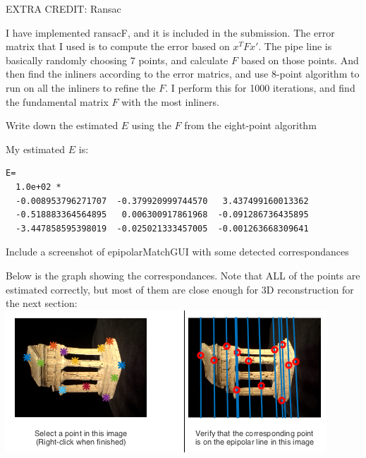 \documentclass[12pt,letterpaper,boxed]{hmcpset}
\begin{document}
\begin{problem}[Q2.X]
EXTRA CREDIT: Ransac
\end{problem}
\begin{solution}
  I have implemented ransacF, and it is included in the submission. The error
  matrix that I used is to compute the error based on $x^TFx'$. The pipe line is
  basically randomly choosing 7 points, and calculate $F$ based on those points. 
  And then find the inliners according to the error matrics, and use 8-point algorithm
  to run on all the inliners to refine the $F$. I perform this for 1000 iterations,
  and find the fundamental matrix $F$ with the most inliners.
\end{solution}

\begin{problem}[2.3]
Write down the estimated $E$ using the $F$ from the eight-point algorithm
\end{problem}
\begin{solution}
My estimated $E$ is:

\begin{verbatim}
E=
  1.0e+02 *
  -0.008953796271707  -0.379920999744570   3.437499160013362
  -0.518883364564895   0.006300917861968  -0.091286736435895
  -3.447858595398019  -0.025021333457005  -0.001263668309641
\end{verbatim}
\end{solution}

\begin{problem}[2.6]
Include a screenshot of epipolarMatchGUI with some detected correspondances
\end{problem}
\begin{solution}
Below is the graph showing the correspondances. Note that ALL of the points are 
estimated correctly, but most of them are close enough for 3D reconstruction for
the next section:\\
\includegraphics[width=\textwidth]{q2_6.png}
\end{solution}
\end{document}
